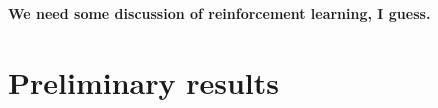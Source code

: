 \documentclass[10pt,twocolumn,letterpaper]{article}
\begin{document}
	
	
	

	 
	
	\textbf{We need some discussion of reinforcement learning, I guess.}

\section{Preliminary results}
\end{document}
